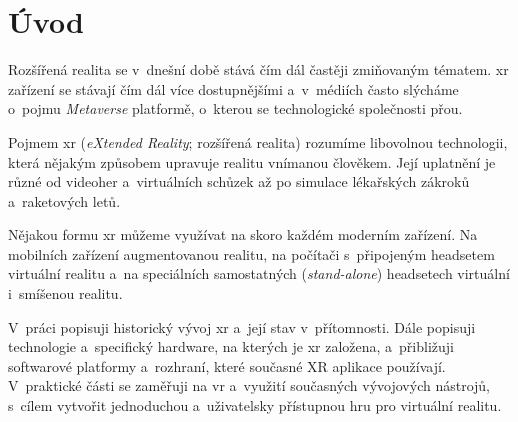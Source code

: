 \chapter*{Úvod}
Rozšířená realita se v~dnešní době stává čím dál častěji zmiňovaným tématem. \gls{xr} zařízení se stávají čím dál více dostupnějšími a~v~médiích často slýcháme o~pojmu \textit{Metaverse} \poml platformě, o~kterou se technologické společnosti přou.

Pojmem \gls{xr} (\textit{eXtended Reality}; rozšířená realita) rozumíme libovolnou technologii, která nějakým způsobem upravuje realitu vnímanou člověkem. Její uplatnění je různé \poml od videoher a~virtuálních schůzek až po simulace lékařských zákroků a~raketových letů. \cite{muni_kybernetika}

Nějakou formu \gls{xr} můžeme využívat na skoro každém moderním zařízení. Na mobilních zařízení augmentovanou realitu, na počítači s~připojeným headsetem virtuální realitu a~na speciálních samostatných (\textit{stand-alone}) headsetech virtuální i~smíšenou realitu.

V~práci popisuji historický vývoj \gls{xr} a~její stav v~přítomnosti. Dále popisuji technologie a~specifický hardware, na kterých je \gls{xr} založena, a~přibližuji softwarové platformy a~rozhraní, které současné XR aplikace používají. V~praktické části se zaměřuji na \gls{vr} a~využití současných vývojových nástrojů, s~cílem vytvořit jednoduchou a~uživatelsky přístupnou hru pro virtuální realitu.